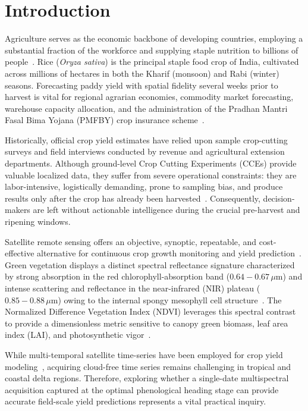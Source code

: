 \documentclass[11pt,a4paper]{article}
\begin{document}
\section{Introduction}
Agriculture serves as the economic backbone of developing countries, employing a substantial fraction of the workforce and supplying staple nutrition to billions of people~\cite{dacfw2020statistics}. Rice (\textit{Oryza sativa}) is the principal staple food crop of India, cultivated across millions of hectares in both the Kharif (monsoon) and Rabi (winter) seasons. Forecasting paddy yield with spatial fidelity several weeks prior to harvest is vital for regional agrarian economies, commodity market forecasting, warehouse capacity allocation, and the administration of the Pradhan Mantri Fasal Bima Yojana (PMFBY) crop insurance scheme~\cite{mosleh2015application}.

Historically, official crop yield estimates have relied upon sample crop-cutting surveys and field interviews conducted by revenue and agricultural extension departments. Although ground-level Crop Cutting Experiments (CCEs) provide valuable localized data, they suffer from severe operational constraints: they are labor-intensive, logistically demanding, prone to sampling bias, and produce results only after the crop has already been harvested~\cite{singh2002rice}. Consequently, decision-makers are left without actionable intelligence during the crucial pre-harvest and ripening windows.

Satellite remote sensing offers an objective, synoptic, repeatable, and cost-effective alternative for continuous crop growth monitoring and yield prediction~\cite{tucker1979red,roy2014landsat}. Green vegetation displays a distinct spectral reflectance signature characterized by strong absorption in the red chlorophyll-absorption band ($0.64 - 0.67\,\mu\text{m}$) and intense scattering and reflectance in the near-infrared (NIR) plateau ($0.85 - 0.88\,\mu\text{m}$) owing to the internal spongy mesophyll cell structure~\cite{rouse1974monitoring}. The Normalized Difference Vegetation Index (NDVI) leverages this spectral contrast to provide a dimensionless metric sensitive to canopy green biomass, leaf area index (LAI), and photosynthetic vigor~\cite{lobell2003use,becker2010crop}.

While multi-temporal satellite time-series have been employed for crop yield modeling~\cite{huang2013rice}, acquiring cloud-free time series remains challenging in tropical and coastal delta regions. Therefore, exploring whether a single-date multispectral acquisition captured at the optimal phenological heading stage can provide accurate field-scale yield predictions represents a vital practical inquiry.
\end{document}
